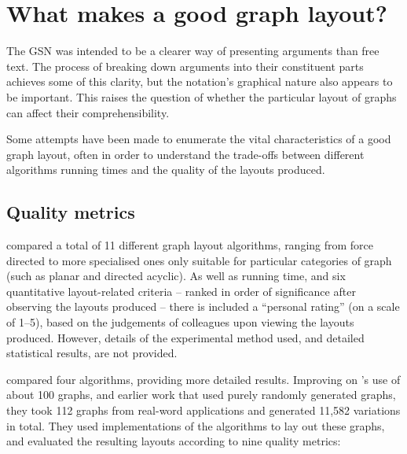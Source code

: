 \section{What makes a good graph layout?}

The GSN was intended to be a clearer way of presenting arguments than free text.
The process of breaking down arguments into their constituent parts achieves some of this clarity,
but the notation's graphical nature also appears to be important.
This raises the question of whether the particular layout of graphs can affect their comprehensibility.

Some attempts have been made to enumerate the vital characteristics of a good graph layout, often in order to understand the trade-offs between different algorithms running times and the quality of the layouts produced.


\subsection{Quality metrics}

\citet{Himsolt95comparingand} compared a total of 11 different graph layout algorithms, ranging from force directed to more specialised ones only suitable for particular categories of graph (such as planar and directed acyclic).
As well as running time, and six quantitative layout-related criteria -- ranked in order of significance after observing the layouts produced -- there is included a ``personal rating'' (on a scale of 1--5), based on the judgements of colleagues upon viewing the layouts produced.
However, details of the experimental method used, and detailed statistical results, are not provided.

\citet{DiBattista1997303} compared four algorithms, providing more detailed results.
Improving on \citeauthor{Himsolt95comparingand}'s use of about 100 graphs, and earlier work  that used purely randomly generated graphs, they took 112 graphs from real-word applications and generated 11,582 variations in total. They used implementations of the algorithms to lay out these graphs, and evaluated the resulting layouts according to nine quality metrics:

